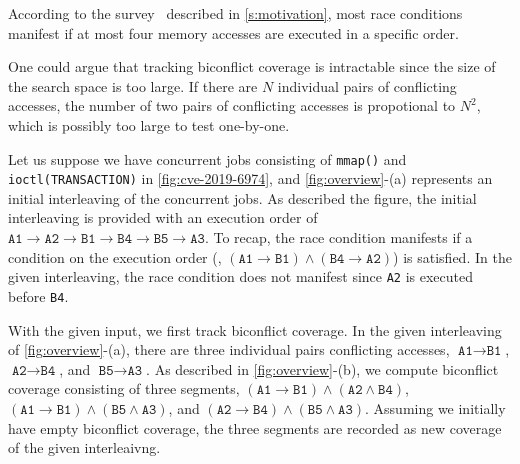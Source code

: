 %
According to the survey~\cite{learningfrommistakes} described in
\autoref{s:motivation}, most race conditions manifest if at most four
memory accesses are executed in a specific order.
%



%
%
One could argue that tracking biconflict coverage is intractable since
the size of the search space is too large.
%
If there are $N$ individual pairs of conflicting accesses, the number
of two pairs of conflicting accesses is propotional to $N^2$, which is
possibly too large to test one-by-one.
%







%
%
Let us suppose we have concurrent jobs consisting of \texttt{mmap()}
and \texttt{ioctl(TRANSACTION)} in \autoref{fig:cve-2019-6974}, and
\autoref{fig:overview}-(a) represents an initial interleaving of the
concurrent jobs.
%
As described the figure, the initial interleaving is provided with an
execution order of
$\texttt{A1} \rightarrow \texttt{A2} \rightarrow \texttt{B1}
\rightarrow \texttt{B4} \rightarrow \texttt{B5} \rightarrow
\texttt{A3}$.
%
To recap, the race condition manifests if a condition on the execution
order (\ie,
$(\texttt{A1} \rightarrow \texttt{B1}) \wedge (\texttt{B4} \rightarrow
\texttt{A2})$) is satisfied. In the given interleaving, the race
condition does not manifest since \texttt{A2} is executed before
\texttt{B4}.


With the given input, we first track biconflict coverage.  In the
given interleaving of \autoref{fig:overview}-(a), there are three
individual pairs conflicting accesses,
$\texttt{A1} \rightarrow \texttt{B1}$,
$\texttt{A2} \rightarrow \texttt{B4}$, and
$\texttt{B5} \rightarrow \texttt{A3}$.
%
\dr{}
As described in \autoref{fig:overview}-(b), we compute biconflict
coverage consisting of three segments,
$(\texttt{A1} \rightarrow \texttt{B1}) \wedge (\texttt{A2} \wedge
\texttt{B4})$,
$(\texttt{A1} \rightarrow \texttt{B1}) \wedge (\texttt{B5} \wedge
\texttt{A3})$, and
$(\texttt{A2} \rightarrow \texttt{B4}) \wedge (\texttt{B5} \wedge
\texttt{A3})$.
%
Assuming we initially have empty biconflict coverage, the three
segments are recorded as new coverage of the given interleaivng.



